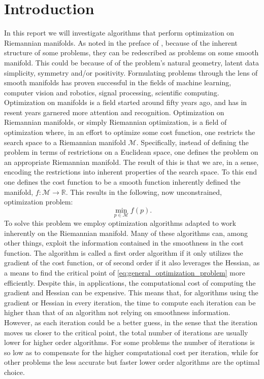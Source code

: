 \section{Introduction}\label{sec:Introduction}

In this report we will investigate algorithms that perform optimization on Riemannian manifolds. As noted in the preface of \cite{Boumal2023}, because of the inherent structure of some problems, they can be redescribed as problems on some smooth manifold. This could be because of of the problem's natural geometry, latent data simplicity, symmetry and/or positivity. Formulating problems through the lens of smooth manifolds has proven successful in the fields of machine learning, computer vision and robotics, signal processing, scientific computing. Optimization on manifolds is a field started around fifty years ago, and has in resent years garnered more attention and recognition. Optimization on Riemannian manifolds, or simply Riemannian optimization, is a field of optimization where, in an effort to optimize some cost function, one restricts the search space to a Riemannian manifold $\mathcal{M}$. Specifically, instead of defining the problem in terms of restrictions on a Euclidean space, one defines the problem on an appropriate Riemannian manifold. The result of this is that we are, in a sense, encoding the restrictions into inherent properties of the search space. To this end one defines the cost function to be a smooth function inherently defined the manifold, $f\colon\mathcal{M}\to\mathbb{R}$. This results in the following, now unconstrained, optimization problem:
\begin{equation}\label{eq:general_optimization_problem}
    \min_{p\in\mathcal{M}}f(p).
\end{equation}
To solve this problem we employ optimization algorithms adapted to work inherently on the Riemannian manifold. Many of these algorithms can, among other things, exploit the information contained in the smoothness in the cost function. The algorithm is called a first order algorithm if it only utilizes the gradient of the cost function, or of second order if it also leverages the Hessian, as a means to find the critical point of \eqref{eq:general_optimization_problem} more efficiently. Despite this, in applications, the computational cost of computing the gradient and Hessian can be expensive. This means that, for algorithms using the gradient or Hessian in every iteration, the time to compute each iteration can be higher than that of an algorithm not relying on smoothness information. However, as each iteration could be a better guess, in the sense that the iteration moves us closer to the critical point, the total number of iterations are usually lower for higher order algorithms. For some problems the number of iterations is so low as to compensate for the higher computational cost per iteration, while for other problems the less accurate but faster lower order algorithms are the optimal choice. 

